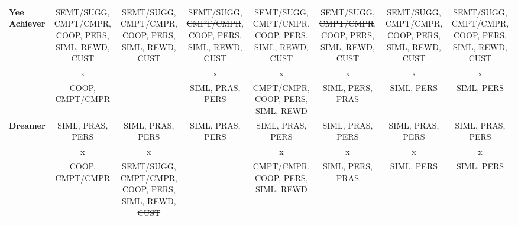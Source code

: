 \begin{landscape}
{\begin{longtable}{|l|c|c|c|c|c|c|c|}
\multirow{3}{*}{\textbf{Yee Achiever}}& 
\multicolumn{1}{|p{2.5cm}|}{\centering \mbox{\st{SEMT/SUGG}}, \mbox{CMPT/CMPR}, COOP, PERS, SIML, REWD, \st{CUST}}&%
\multicolumn{1}{|p{2.5cm}|}{\centering \mbox{SEMT/SUGG}, \mbox{CMPT/CMPR}, COOP, PERS, SIML, REWD, CUST} &%
\multicolumn{1}{|p{2.5cm}|}{\centering \mbox{\st{SEMT/SUGG}}, \mbox{\st{CMPT/CMPR}}, \st{COOP}, PERS, SIML, \st{REWD}, \st{CUST}}&%
\multicolumn{1}{|p{2.5cm}|}{\centering \mbox{\st{SEMT/SUGG}}, \mbox{CMPT/CMPR}, COOP, PERS, SIML, REWD, \st{CUST}}&%
\multicolumn{1}{|p{2.5cm}|}{\centering \mbox{\st{SEMT/SUGG}}, \mbox{\st{CMPT/CMPR}}, \st{COOP}, PERS, SIML, \st{REWD}, \st{CUST}}&%
\multicolumn{1}{|p{2.5cm}|}{\centering \mbox{SEMT/SUGG}, \mbox{CMPT/CMPR}, COOP, PERS, SIML, REWD, CUST}&%
\multicolumn{1}{|p{2.5cm}|}{\centering \mbox{SEMT/SUGG}, \mbox{CMPT/CMPR}, COOP, PERS, SIML, REWD, CUST}\tabularnewline
& 
\multicolumn{1}{|p{2.5cm}|}{\centering x}&
&
\multicolumn{1}{|p{2.5cm}|}{\centering x}&
\multicolumn{1}{|p{2.5cm}|}{\centering x}&
\multicolumn{1}{|p{2.5cm}|}{\centering x}&
\multicolumn{1}{|p{2.5cm}|}{\centering x}&
\multicolumn{1}{|p{2.5cm}|}{\centering x}\tabularnewline
& 
\multicolumn{1}{|p{2.5cm}|}{\centering COOP, CMPT/CMPR}&%
&%
\multicolumn{1}{|p{2.5cm}|}{\centering SIML, PRAS, PERS}&%
\multicolumn{1}{|p{2.5cm}|}{\centering CMPT/CMPR, COOP, PERS, SIML, REWD}&%
\multicolumn{1}{|p{2.5cm}|}{\centering SIML, PERS, PRAS}&%
\multicolumn{1}{|p{2.5cm}|}{\centering SIML, PERS}&%
\multicolumn{1}{|p{2.5cm}|}{\centering SIML, PERS}\tabularnewline
\hline


\multirow{3}{*}{\textbf{Dreamer}}& 
\multicolumn{1}{|p{2.5cm}|}{\centering SIML, PRAS, PERS}&
\multicolumn{1}{|p{2.5cm}|}{\centering SIML, PRAS, PERS} &
\multicolumn{1}{|p{2.5cm}|}{\centering SIML, PRAS, PERS}&
\multicolumn{1}{|p{2.5cm}|}{\centering SIML, PRAS, PERS}&
\multicolumn{1}{|p{2.5cm}|}{\centering SIML, PRAS, PERS}&
\multicolumn{1}{|p{2.5cm}|}{\centering SIML, PRAS, PERS}&
\multicolumn{1}{|p{2.5cm}|}{\centering SIML, PRAS, PERS}\tabularnewline
& 
\multicolumn{1}{|p{2.5cm}|}{\centering x}&
\multicolumn{1}{|p{2.5cm}|}{\centering x}&
&
\multicolumn{1}{|p{2.5cm}|}{\centering x}&
\multicolumn{1}{|p{2.5cm}|}{\centering x}&
\multicolumn{1}{|p{2.5cm}|}{\centering x}&
\multicolumn{1}{|p{2.5cm}|}{\centering x}\tabularnewline
& 
\multicolumn{1}{|p{2.5cm}|}{\centering \st{COOP}, \st{CMPT/CMPR}}&%
\multicolumn{1}{|p{2.5cm}|}{\centering \mbox{\st{SEMT/SUGG}}, \mbox{\st{CMPT/CMPR}}, \st{COOP}, PERS, SIML, \st{REWD}, \st{CUST}}&%
&%
\multicolumn{1}{|p{2.5cm}|}{\centering CMPT/CMPR, COOP, PERS, SIML, REWD}&%
\multicolumn{1}{|p{2.5cm}|}{\centering SIML, PERS, PRAS}&%
\multicolumn{1}{|p{2.5cm}|}{\centering SIML, PERS}&%
\multicolumn{1}{|p{2.5cm}|}{\centering SIML, PERS}\tabularnewline
\hline



\end{longtable}}
\end{landscape}
